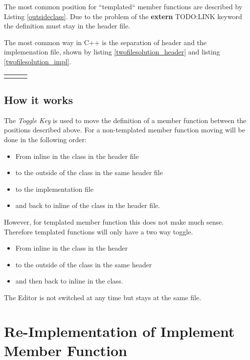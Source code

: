 \documentclass[a4paper,12pt]{scrreprt}
\begin{document}
The most common position for ``templated`` member functions are described by
Listing \ref{outsideclass}. Due to the problem of the \textbf{extern} TODO:LINK
keyword the definition must stay in the header file.


The most common way in C++ is the separation of header and the implemenation
file, shown by listing \ref{twofilesolution_header} and listing
\ref{twofilesolution_impl}.

\begin{tabular}{p{5cm}p{.5cm}p{6cm}}

& & 

\end{tabular}

\subsection{How it works}

The \textit{Toggle Key} is used to move the definition of a member function
between the positions described above. For a non-templated member function
moving will be done in the following order:
\begin{itemize}
 \item From inline in the class in the header file
 \item to the outside of the class in the same header file
 \item to the implementation file
 \item and back to inline of the class in the header file.
\end{itemize}

However, for templated member function this does not make much sense. Therefore
templated functions will only have a two way toggle.
\begin{itemize}
 \item From inline in the class in the header
 \item to the outside of the class in the same header
 \item and then back to inline in the class.
\end{itemize}

The Editor is not switched at any time but stays at the same file.

\section{Re-Implementation of Implement Member Function}
\end{document}
